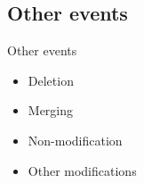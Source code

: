 \documentclass[presentation]{beamer}
\begin{document}
\subsection{Other events}

\begin{frame}{Other events}
	\begin{itemize}
		\item Deletion

		      \vspace{1em}

		\item Merging

		      \vspace{1em}

		\item Non-modification

		      \vspace{1em}

		\item Other modifications
	\end{itemize}
\end{frame}




\end{document}
